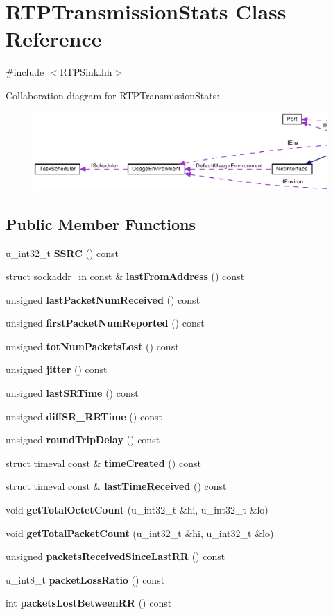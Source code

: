 \section{R\+T\+P\+Transmission\+Stats Class Reference}
\label{classRTPTransmissionStats}


{\ttfamily \#include $<$R\+T\+P\+Sink.\+hh$>$}



Collaboration diagram for R\+T\+P\+Transmission\+Stats\+:
\nopagebreak
\begin{figure}[H]
\begin{center}
\leavevmode
\includegraphics[width=350pt]{classRTPTransmissionStats__coll__graph}
\end{center}
\end{figure}
\subsection*{Public Member Functions}
\begin{DoxyCompactItemize}
\item 
u\+\_\+int32\+\_\+t {\bf S\+S\+R\+C} () const 
\item 
struct sockaddr\+\_\+in const \& {\bf last\+From\+Address} () const 
\item 
unsigned {\bf last\+Packet\+Num\+Received} () const 
\item 
unsigned {\bf first\+Packet\+Num\+Reported} () const 
\item 
unsigned {\bf tot\+Num\+Packets\+Lost} () const 
\item 
unsigned {\bf jitter} () const 
\item 
unsigned {\bf last\+S\+R\+Time} () const 
\item 
unsigned {\bf diff\+S\+R\+\_\+\+R\+R\+Time} () const 
\item 
unsigned {\bf round\+Trip\+Delay} () const 
\item 
struct timeval const \& {\bf time\+Created} () const 
\item 
struct timeval const \& {\bf last\+Time\+Received} () const 
\item 
void {\bf get\+Total\+Octet\+Count} (u\+\_\+int32\+\_\+t \&hi, u\+\_\+int32\+\_\+t \&lo)
\item 
void {\bf get\+Total\+Packet\+Count} (u\+\_\+int32\+\_\+t \&hi, u\+\_\+int32\+\_\+t \&lo)
\item 
unsigned {\bf packets\+Received\+Since\+Last\+R\+R} () const 
\item 
u\+\_\+int8\+\_\+t {\bf packet\+Loss\+Ratio} () const 
\item 
int {\bf packets\+Lost\+Between\+R\+R} () const 
\end{DoxyCompactItemize}
